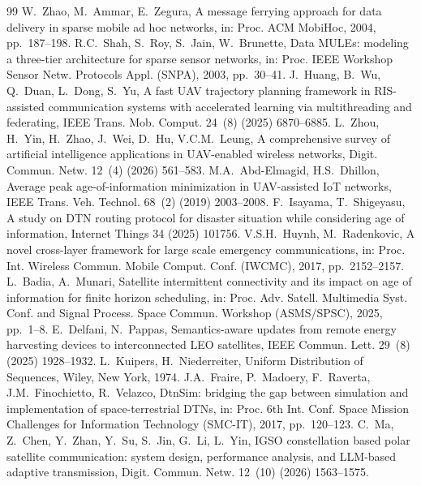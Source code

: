 \documentclass[twocolumn,3p,times,procedia]{elsarticle}
\theoremstyle{plain}
\theoremstyle{remark}
\begin{document}
\begin{thebibliography}{99}
W.~Zhao, M.~Ammar, E.~Zegura, A message ferrying approach for data delivery in sparse mobile ad hoc networks, in: Proc. ACM MobiHoc, 2004, pp.~187--198.
R.C.~Shah, S.~Roy, S.~Jain, W.~Brunette, Data MULEs: modeling a three-tier architecture for sparse sensor networks, in: Proc. IEEE Workshop Sensor Netw. Protocols Appl. (SNPA), 2003, pp.~30--41.
J.~Huang, B.~Wu, Q.~Duan, L.~Dong, S.~Yu, A fast UAV trajectory planning framework in RIS-assisted communication systems with accelerated learning via multithreading and federating, IEEE Trans. Mob. Comput. 24~(8) (2025) 6870--6885.
L.~Zhou, H.~Yin, H.~Zhao, J.~Wei, D.~Hu, V.C.M.~Leung, A comprehensive survey of artificial intelligence applications in UAV-enabled wireless networks, Digit. Commun. Netw. 12~(4) (2026) 561--583.
M.A.~Abd-Elmagid, H.S.~Dhillon, Average peak age-of-information minimization in UAV-assisted IoT networks, IEEE Trans. Veh. Technol. 68~(2) (2019) 2003--2008.
F.~Isayama, T.~Shigeyasu, A study on DTN routing protocol for disaster situation while considering age of information, Internet Things 34 (2025) 101756.
V.S.H.~Huynh, M.~Radenkovic, A novel cross-layer framework for large scale emergency communications, in: Proc. Int. Wireless Commun. Mobile Comput. Conf. (IWCMC), 2017, pp.~2152--2157.
L.~Badia, A.~Munari, Satellite intermittent connectivity and its impact on age of information for finite horizon scheduling, in: Proc. Adv. Satell. Multimedia Syst. Conf. and Signal Process. Space Commun. Workshop (ASMS/SPSC), 2025, pp.~1--8.
E.~Delfani, N.~Pappas, Semantics-aware updates from remote energy harvesting devices to interconnected LEO satellites, IEEE Commun. Lett. 29~(8) (2025) 1928--1932.
L.~Kuipers, H.~Niederreiter, Uniform Distribution of Sequences, Wiley, New York, 1974.
J.A.~Fraire, P.~Madoery, F.~Raverta, J.M.~Finochietto, R.~Velazco, DtnSim: bridging the gap between simulation and implementation of space-terrestrial DTNs, in: Proc. 6th Int. Conf. Space Mission Challenges for Information Technology (SMC-IT), 2017, pp.~120--123.
C.~Ma, Z.~Chen, Y.~Zhan, Y.~Su, S.~Jin, G.~Li, L.~Yin, IGSO constellation based polar satellite communication: system design, performance analysis, and LLM-based adaptive transmission, Digit. Commun. Netw. 12~(10) (2026) 1563--1575.
\end{thebibliography}
\end{document}
